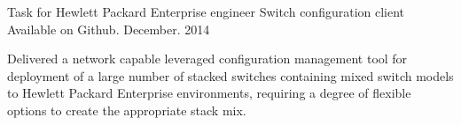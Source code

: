 \begin{cventries}
  \cventry
    {Task for Hewlett Packard Enterprise engineer} %
    {Switch configuration client} %
    {Available on Github.} %
    {December. 2014} %
    {
      \begin{cvitems} %
  \item {Delivered a network capable leveraged configuration management tool for deployment of a large number of stacked switches containing mixed switch models to Hewlett Packard Enterprise environments, requiring a degree of flexible options to create the appropriate stack mix.}
      \end{cvitems}
    }

\end{cventries}

